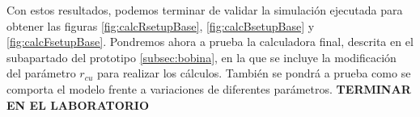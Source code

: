 Con estos resultados, podemos terminar de validar la simulación ejecutada para obtener las figuras \ref{fig:calcRsetupBase}, \ref{fig:calcBsetupBase} y \ref{fig:calcFsetupBase}. Pondremos ahora a prueba la calculadora final, descrita en el subapartado del prototipo \ref{subsec:bobina}, en la que se incluye la modificación del parámetro \(r_{cu}\) para realizar los cálculos. También se pondrá a prueba como se comporta el modelo frente a variaciones de diferentes parámetros. \textbf{TERMINAR EN EL LABORATORIO}